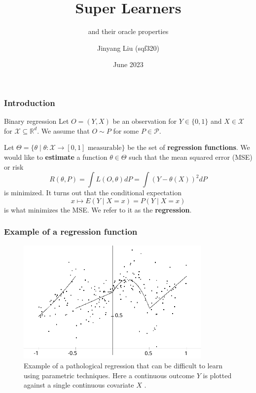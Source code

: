 \documentclass{beamer}
\title{Super Learners}
\subtitle{and their oracle properties}
\author[Jinyang Liu (sqf320)]{Jinyang Liu (sqf320)}
\institute[UCPH] %
{
  Department of Mathematical Sciences\\
  University of Copenhagen
}
\date[VLC 2023]{June 2023}
\newcommand{\btheta}{\theta}
\begin{document}
\frame{\titlepage}
\begin{frame}
    \frametitle{Introduction}
    \begin{block}{Binary regression}
        Let $ O = (Y, X) $ be an observation for $ Y \in \{0,1\} $ and $ X \in \mathcal{X}$ for $ \mathcal{X} \subseteq \mathbb{R}^{d} $. We assume that $ O \sim P $ for some $ P \in \mathcal{P} $.
    \end{block}
    Let $ \Theta = \{\btheta \mid \btheta : \mathcal{X} \to [0,1] \text{ measurable}\} $ be the set of \textbf{regression functions}. We would like to \textbf{estimate} a function $ \btheta \in \Theta $ such that the mean squared error (MSE) or risk
        $$
            R(\btheta , P) = \int L(O, \btheta) dP = \int (Y - \theta(X))^2 d P  
        $$
        is minimized. It turns out that the conditional expectation $$ x \mapsto E(Y \mid X = x) = P(Y \mid X = x) $$ is what minimizes the MSE. We refer to it as the \textbf{regression}.  
\end{frame}

\begin{frame}
    \frametitle{Example of a regression function}
    \begin{figure}[H]
        \centering
        \includegraphics[width=0.85\textwidth]{figures/trueregression}
        \caption{Example of a pathological regression that can be difficult to learn using parametric techniques. Here a continuous outcome $ Y $ is plotted against a single continuous covariate $ X $ \citep{gyorfi2002distribution}.}
    \end{figure}
\end{frame}
\end{document}
